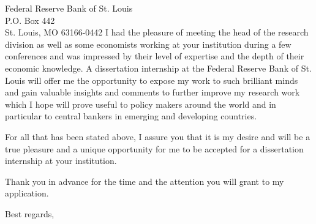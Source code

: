 \documentclass[10pt,a4paper]{letter}
\begin{document}
\begin{letter}{Federal Reserve Bank of St. Louis \\ P.O. Box 442 \\ St. Louis, MO 63166-0442}
I had the pleasure of meeting the head of the research division as well as some economists working at your institution during a few conferences and was impressed by their level of expertise and the depth of their economic knowledge. A dissertation internship at the Federal Reserve Bank of St. Louis will offer me the opportunity to expose my work to such brilliant minds and gain valuable insights and comments to further improve my research work which I hope will prove useful to policy makers around the world and in particular to central bankers in emerging and developing countries. 

For all that has been stated above, I assure you that it is my desire and will be a true pleasure and a unique opportunity for me to be accepted for a dissertation internship at your institution.

Thank you in advance for the time and the attention you will grant to my application.

 
\closing{Best regards,} 
\end{letter} 
\end{document}
